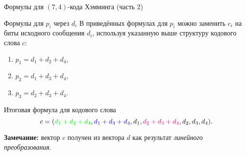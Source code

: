 \begin{frame}{Формулы для $(7,4)$-кода Хэмминга (часть 2)}

\begin{block}{Формулы для $p_i$ через $d_i$}
В приведённых формулах для $p_i$ можно заменить $c_i$ на биты исходного сообщения $d_i$, используя указанную выше структуру кодового слова $c$:
\begin{enumerate}
    \item $p_1 = d_1 + d_2 + d_4$,
    \item $p_2 = d_1 + d_3 + d_4$,
    \item $p_3 = d_2 + d_3 + d_4$.
\end{enumerate}
\end{block}

\begin{block}{Итоговая формула для кодового слова}
\[
    c = (
        \textcolor{green}{d_1 + d_2 + d_4},
        \textcolor{blue}{d_1 + d_3 + d_4},
        d_1,
        \textcolor{magenta}{d_2 + d_3 + d_4},
        d_2,
        d_3,
        d_4).
\]

\textbf{Замечание:} вектор $c$ получен из вектора $d$ как результат \emph{линейного преобразования}.
\end{block}

\end{frame}

